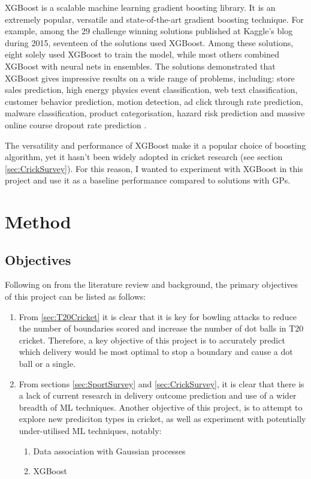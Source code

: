 \documentclass[12pt,a4paper]{report}
\theoremstyle{definition}
\begin{document}
XGBoost is a scalable machine learning gradient boosting library.  
It is an extremely popular, versatile and state-of-the-art gradient boosting technique.
For example, among the 29 challenge winning solutions published at Kaggle’s blog during 2015, seventeen of the solutions used XGBoost.
Among these solutions, eight solely used XGBoost to train the model, while most others combined XGBoost with neural nets in ensembles.
The solutions demonstrated that XGBoost gives impressive results on a wide range of problems, including: store sales prediction, high energy physics event classification, web text classification, customer behavior prediction, motion detection, ad click through rate prediction, malware classification, product categorisation, hazard risk prediction and massive online course dropout rate prediction \citep{Chen2016}.

The versatility and performance of XGBoost make it a popular choice of boosting algorithm, yet it hasn't been widely adopted in cricket research (see section \ref{sec:CrickSurvey}).
For this reason, I wanted to experiment with XGBoost in this project and use it as a baseline performance compared to solutions with GPs.

\chapter{Method} \label{chap:Method}

\section{Objectives}

Following on from the literature review and background, the primary objectives of this project can be listed as follows:

\begin{enumerate}
  \item From \ref{sec:T20Cricket} it is clear that it is key for bowling attacks to reduce the number of boundaries scored and increase the number of dot balls in T20 cricket.
Therefore, a key objective of this project is to accurately predict which delivery would be most optimal to stop a boundary and cause a dot ball or a single.
  \item From sections \ref{sec:SportSurvey} and \ref{sec:CrickSurvey}, it is clear that there is a lack of current research in delivery outcome prediction and use of a wider breadth of ML techniques. 
Another objective of this project, is to attempt to explore new prediciton types in cricket, as well as experiment with potentially under-utilised  ML techniques, notably:
  \begin{enumerate}
	\item Data association with Gaussian processes
	\item XGBoost
  \end{enumerate}
\end{enumerate}
\end{document}
